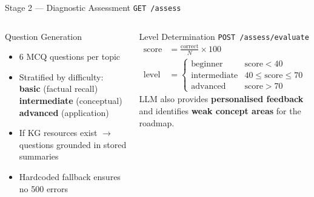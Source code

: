 \documentclass[aspectratio=169,12pt]{beamer}
\begin{document}
\begin{frame}{Stage 2 — Diagnostic Assessment \texttt{GET /assess}}
  \begin{columns}
      \begin{block}{Question Generation}
        \begin{itemize}\small
          \item 6 MCQ questions per topic
          \item Stratified by difficulty:\\
             \textcolor{codegreen}{\textbf{basic}} (factual recall)\\
             \textcolor{codeorange}{\textbf{intermediate}} (conceptual)\\
             \textcolor{accent}{\textbf{advanced}} (application)
          \item If KG resources exist $\to$ questions grounded in stored summaries
          \item Hardcoded fallback ensures no 500 errors
        \end{itemize}
      \end{block}
      \begin{block}{Level Determination \texttt{POST /assess/evaluate}}
        \begin{align*}
          \text{score} &= \frac{\text{correct}}{N} \times 100 \\[4pt]
          \text{level} &= \begin{cases}
            \text{beginner}     & \text{score} < 40 \\
            \text{intermediate} & 40 \le \text{score} \le 70 \\
            \text{advanced}     & \text{score} > 70
          \end{cases}
        \end{align*}
        \vspace{4pt}
        LLM also provides \textbf{personalised feedback} and
        identifies \textbf{weak concept areas} for the roadmap.
      \end{block}
  \end{columns}
\end{frame}
\end{document}
